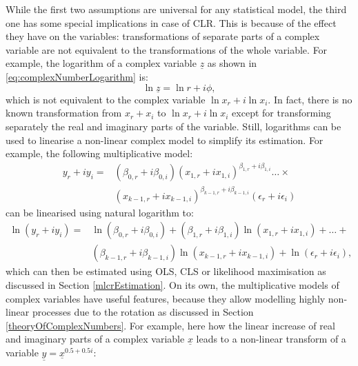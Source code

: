 \documentclass[
]{book}
\begin{document}
While the first two assumptions are universal for any statistical model, the third one has some special implications in case of CLR. This is because of the effect they have on the variables: transformations of separate parts of a complex variable are not equivalent to the transformations of the whole variable. For example, the logarithm of a complex variable \(\underline{z}\) as shown in \eqref{eq:complexNumberLogarithm} is:
\begin{equation*}
    \ln \underline{z} = \ln r + i \phi ,
\end{equation*}
which is not equivalent to the complex variable \(\ln x_r + i \ln x_i\). In fact, there is no known transformation from \(x_r + x_i\) to \(\ln x_r + i \ln x_i\) except for transforming separately the real and imaginary parts of the variable. Still, logarithms can be used to linearise a non-linear complex model to simplify its estimation. For example, the following multiplicative model:
\begin{equation*}
    \begin{aligned}
    y_{r} + i y_{i} = & (\beta_{0,r} + i \beta_{0,i}) (x_{1,r} + i x_{1,i}) ^{\beta_{1,r} + i \beta_{1,i}} \dots \times \\
                      & (x_{k-1,r} + i x_{k-1,i}) ^{\beta_{k-1,r} + i \beta_{k-1,i}} (\epsilon_{r} + i \epsilon_{i})
    \end{aligned}
\end{equation*}
can be linearised using natural logarithm to:
\begin{equation*}
    \begin{aligned}
    \ln (y_{r} + i y_{i}) = & \ln (\beta_{0,r} + i \beta_{0,i}) + (\beta_{1,r} + i \beta_{1,i}) \ln(x_{1,r} + i x_{1,i}) + \dots + \\
                            & (\beta_{k-1,r} + i \beta_{k-1,i}) \ln (x_{k-1,r} + i x_{k-1,i}) + \ln (\epsilon_{r} + i \epsilon_{i}),
    \end{aligned}
\end{equation*}
which can then be estimated using OLS, CLS or likelihood maximisation as discussed in Section \ref{mlcrEstimation}. On its own, the multiplicative models of complex variables have useful features, because they allow modelling highly non-linear processes due to the rotation as discussed in Section \ref{theoryOfComplexNumbers}. For example, here how the linear increase of real and imaginary parts of a complex variable \(\underline{x}\) leads to a non-linear transform of a variable \(\underline{y}=\underline{x}^{0.5+0.5i}\):
\end{document}

